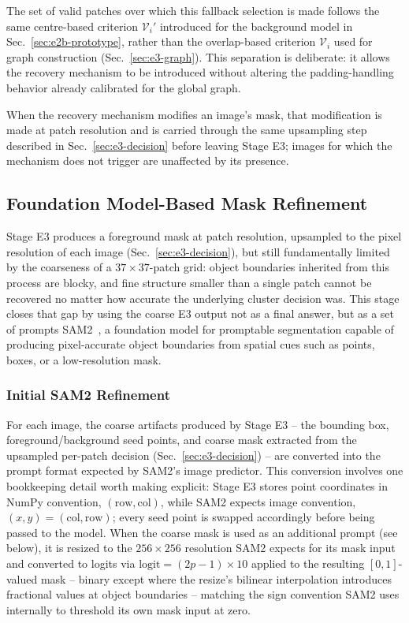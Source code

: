 The set of valid patches over which this fallback selection is made follows the same centre-based criterion $\mathcal{V}_i'$ introduced for the background model in Sec.~\ref{sec:e2b-prototype}, rather than the overlap-based criterion $\mathcal{V}_i$ used for graph construction (Sec.~\ref{sec:e3-graph}). This separation is deliberate: it allows the recovery mechanism to be introduced without altering the padding-handling behavior already calibrated for the global graph.

When the recovery mechanism modifies an image's mask, that modification is made at patch resolution and is carried through the same upsampling step described in Sec.~\ref{sec:e3-decision} before leaving Stage E3; images for which the mechanism does not trigger are unaffected by its presence.

\subsection{Foundation Model-Based Mask Refinement}
\label{sec:e4}

Stage E3 produces a foreground mask at patch resolution, upsampled to the pixel resolution of each image (Sec.~\ref{sec:e3-decision}), but still fundamentally limited by the coarseness of a $37{\times}37$-patch grid: object boundaries inherited from this process are blocky, and fine structure smaller than a single patch cannot be recovered no matter how accurate the underlying cluster decision was. This stage closes that gap by using the coarse E3 output not as a final answer, but as a set of prompts SAM2~\cite{ravi2024sam2}, a foundation model for promptable segmentation capable of producing pixel-accurate object boundaries from spatial cues such as points, boxes, or a low-resolution mask.

\subsubsection{Initial SAM2 Refinement}
\label{sec:e4-initial}

For each image, the coarse artifacts produced by Stage E3 -- the bounding box, foreground/background seed points, and coarse mask extracted from the upsampled per-patch decision (Sec.~\ref{sec:e3-decision}) -- are converted into the prompt format expected by SAM2's image predictor. This conversion involves one bookkeeping detail worth making explicit: Stage E3 stores point coordinates in NumPy convention, $(\text{row}, \text{col})$, while SAM2 expects image convention, $(x, y) = (\text{col}, \text{row})$; every seed point is swapped accordingly before being passed to the model. When the coarse mask is used as an additional prompt (see below), it is resized to the $256{\times}256$ resolution SAM2 expects for its mask input and converted to logits via $\text{logit} = (2p-1)\times10$ applied to the resulting $[0,1]$-valued mask -- binary except where the resize's bilinear interpolation introduces fractional values at object boundaries -- matching the sign convention SAM2 uses internally to threshold its own mask input at zero.


